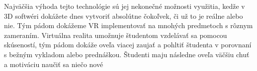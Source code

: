 \par \qquad Najväčšia výhoda tejto technológie sú jej nekonečné možnosti využitia, kedže
v 3D softwéri dokážete dnes vytvoriť absolútne čokoľvek, či už to je reálne alebo nie. Tým pádom
dokážeme VR implementovať na mnohých predmetoch s rôznym zameraním. Virtuálna realita umožnuje študentom vzdelávať
sa pomocou skúseností, tým pádom dokáže oveľa viacej zaujať a pohltiť študenta v porovnaní s bežným
vykladom alebo prednáškou. Študenti maju následne oveľa väčšiu chuť a motiváciu naučiť sa niečo nové
\citep{zdroj6}